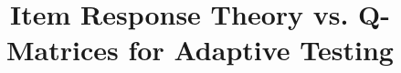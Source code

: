 \documentclass{sig-alternate}
\begin{document}
%

\title{Item Response Theory vs. Q-Matrices for Adaptive Testing}
%
%
%
%
%
\end{document}
